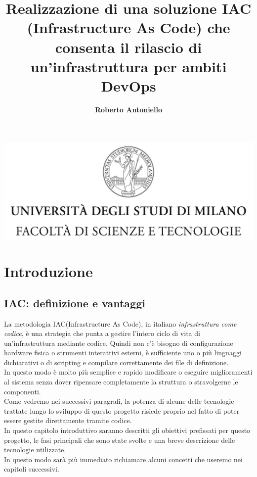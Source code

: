 \documentclass[a4paper,12pt]{report}
\begin{document}
\begin{center}
\includegraphics[width=\textwidth]{Logo.jpg}
\title{Realizzazione di una soluzione IAC (Infrastructure As Code) che consenta il rilascio di un'infrastruttura per ambiti DevOps}
\end{center}
\author{\textbf{Roberto Antoniello}}

\beforepreface

\afterpreface
%  
\chapter{Introduzione}
\section{IAC: definizione e vantaggi}
La metodologia IAC(Infrastructure As Code), in italiano \textit{infrastruttura come codice}, è una strategia che punta a gestire l'intero ciclo di vita di un'infrastruttura mediante codice. Quindi non c'è bisogno di configurazione hardware fisica o strumenti interattivi esterni, è sufficiente uno o più linguaggi dichiarativi o di scripting e compilare correttamente dei file di definizione.\cite{iacdef} \\ 
In questo modo è molto più semplice e rapido modificare o eseguire miglioramenti al sistema senza dover ripensare completamente la struttura o stravolgerne le componenti. \\
Come vedremo nei successivi paragrafi, la potenza di alcune delle tecnologie trattate lungo lo sviluppo di questo progetto risiede proprio nel fatto di poter essere gestite direttamente tramite codice.\\
In questo capitolo introduttivo saranno descritti gli obiettivi prefissati per questo progetto, le fasi principali che sono state svolte e una breve descrizione delle tecnologie utilizzate. \\
In questo modo sarà più immediato richiamare alcuni concetti che useremo nei capitoli successivi.
\end{document}
